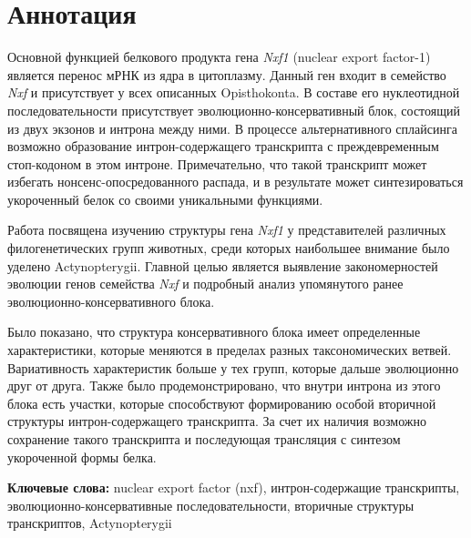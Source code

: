 \clearpage
\section*{Аннотация}

Основной функцией белкового продукта гена \textit{Nxf1} (nuclear export factor-1) является перенос мРНК из ядра в цитоплазму. Данный ген входит в семейство \textit{Nxf} и присутствует у всех описанных Opisthokonta. В составе его нуклеотидной последовательности присутствует эволюционно-консервативный блок, состоящий из двух экзонов и интрона между ними. В процессе альтернативного сплайсинга возможно образование интрон-содержащего транскрипта с преждевременным стоп-кодоном в этом интроне. Примечательно, что такой транскрипт может избегать нонсенс-опосредованного распада, и в результате может синтезироваться укороченный белок со своими уникальными функциями.

Работа посвящена изучению структуры гена \textit{Nxf1} у представителей различных филогенетических групп животных, среди которых наибольшее внимание было уделено Actynopterygii. Главной целью является выявление закономерностей эволюции генов семейства \textit{Nxf} и подробный анализ упомянутого ранее эволюционно-консервативного блока.

Было показано, что структура консервативного блока имеет определенные характеристики, которые меняются в пределах разных таксономических ветвей. Вариативность характеристик больше у тех групп, которые дальше эволюционно друг от друга. Также было продемонстрировано, что внутри интрона из этого блока есть участки, которые способствуют формированию особой вторичной структуры интрон-содержащего транскрипта. За счет их наличия возможно сохранение такого транскрипта и последующая трансляция с синтезом укороченной формы белка.

\vspace{1em}

\textbf{Ключевые слова:} nuclear export factor (nxf), интрон-содержащие транскрипты, эволюционно-консервативные последовательности, вторичные структуры транскриптов, Actynopterygii